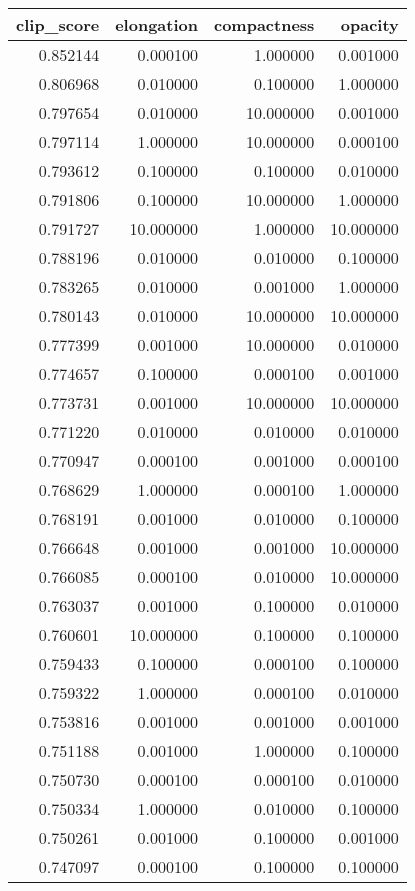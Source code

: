 \begin{tabular}{rrrr}
\toprule
clip_score & elongation & compactness & opacity \\
\midrule
0.852144 & 0.000100 & 1.000000 & 0.001000 \\
0.806968 & 0.010000 & 0.100000 & 1.000000 \\
0.797654 & 0.010000 & 10.000000 & 0.001000 \\
0.797114 & 1.000000 & 10.000000 & 0.000100 \\
0.793612 & 0.100000 & 0.100000 & 0.010000 \\
0.791806 & 0.100000 & 10.000000 & 1.000000 \\
0.791727 & 10.000000 & 1.000000 & 10.000000 \\
0.788196 & 0.010000 & 0.010000 & 0.100000 \\
0.783265 & 0.010000 & 0.001000 & 1.000000 \\
0.780143 & 0.010000 & 10.000000 & 10.000000 \\
0.777399 & 0.001000 & 10.000000 & 0.010000 \\
0.774657 & 0.100000 & 0.000100 & 0.001000 \\
0.773731 & 0.001000 & 10.000000 & 10.000000 \\
0.771220 & 0.010000 & 0.010000 & 0.010000 \\
0.770947 & 0.000100 & 0.001000 & 0.000100 \\
0.768629 & 1.000000 & 0.000100 & 1.000000 \\
0.768191 & 0.001000 & 0.010000 & 0.100000 \\
0.766648 & 0.001000 & 0.001000 & 10.000000 \\
0.766085 & 0.000100 & 0.010000 & 10.000000 \\
0.763037 & 0.001000 & 0.100000 & 0.010000 \\
0.760601 & 10.000000 & 0.100000 & 0.100000 \\
0.759433 & 0.100000 & 0.000100 & 0.100000 \\
0.759322 & 1.000000 & 0.000100 & 0.010000 \\
0.753816 & 0.001000 & 0.001000 & 0.001000 \\
0.751188 & 0.001000 & 1.000000 & 0.100000 \\
0.750730 & 0.000100 & 0.000100 & 0.010000 \\
0.750334 & 1.000000 & 0.010000 & 0.100000 \\
0.750261 & 0.001000 & 0.100000 & 0.001000 \\
0.747097 & 0.000100 & 0.100000 & 0.100000 \\

\end{tabular}
